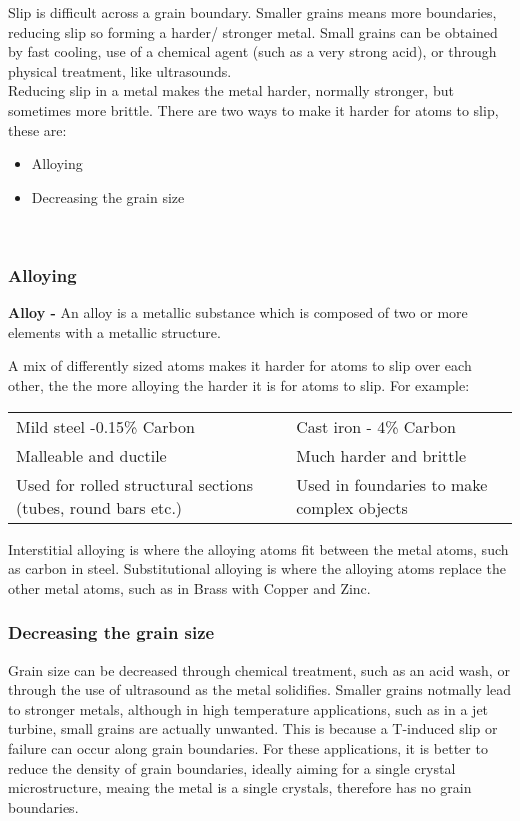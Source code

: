 \documentclass[a4paper, 12pt]{article}
\begin{document}
			Slip is difficult across a grain boundary. Smaller grains means more boundaries, reducing slip so forming a harder/ stronger metal. Small grains can be obtained by fast cooling, use of a chemical agent (such as a very strong acid), or through physical treatment, like ultrasounds. \\
			Reducing slip in a metal makes the metal harder, normally stronger, but sometimes more brittle. There are two ways to make it harder for atoms to slip, these are:
			\begin{itemize}
				\item Alloying
				\item Decreasing the grain size
			\end{itemize}
			
			\hfill \\
			
			\subsubsection*{Alloying}
				\textbf{Alloy - } An alloy is a metallic substance which is composed of two or more elements with a metallic structure. 
				\par
				A mix of differently sized atoms makes it harder for atoms to slip over each other, the the more alloying the harder it is for atoms to slip. For example: \\
				\par
				\begin{tabularx}{\linewidth}{X X}
					Mild steel -0.15\% Carbon & Cast iron - 4\% Carbon \\
					Malleable and ductile & Much harder and brittle \\
					Used for rolled structural sections (tubes, round bars etc.) & Used in foundaries to make complex objects \\
				\end{tabularx}
				
				Interstitial alloying is where the alloying atoms fit between the metal atoms, such as carbon in steel. Substitutional alloying is where the alloying atoms replace the other metal atoms, such as in Brass with Copper and Zinc.
				
			\subsubsection*{Decreasing the grain size}
				Grain size can be decreased through chemical treatment, such as an acid wash, or through the use of ultrasound as the metal solidifies. Smaller grains notmally lead to stronger metals, although in high temperature applications, such as in a jet turbine, small grains are actually unwanted. This is because a T-induced slip or failure can occur along grain boundaries. For these applications, it is better to reduce the density of grain boundaries, ideally aiming for a single crystal microstructure, meaing the metal is a single crystals, therefore has no grain boundaries.
\end{document}
